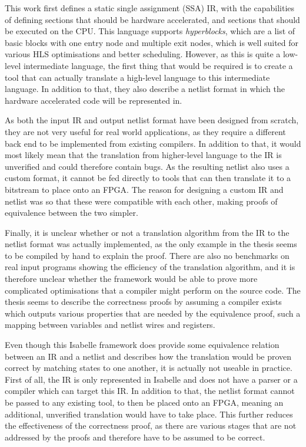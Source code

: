 This work first defines a static single assignment (SSA) IR, with the
capabilities of defining sections that should be hardware accelerated, and
sections that should be executed on the CPU.  This language supports
\emph{hyperblocks}, which are a list of basic blocks with one entry node and
multiple exit nodes, which is well suited for various HLS optimisations and
better scheduling.  However, as this is quite a low-level intermediate language,
the first thing that would be required is to create a tool that can actually
translate a high-level language to this intermediate language.  In addition to
that, they also describe a netlist format in which the hardware accelerated code
will be represented in.

As both the input IR and output netlist format have been designed from scratch,
they are not very useful for real world applications, as they require a
different back end to be implemented from existing compilers.  In addition to
that, it would most likely mean that the translation from higher-level language
to the IR is unverified and could therefore contain bugs.  As the resulting
netlist also uses a custom format, it cannot be fed directly to tools that can
then translate it to a bitstream to place onto an FPGA. The reason for designing
a custom IR and netlist was so that these were compatible with each other,
making proofs of equivalence between the two simpler.

Finally, it is unclear whether or not a translation algorithm from the IR to the
netlist format was actually implemented, as the only example in the thesis seems
to be compiled by hand to explain the proof.  There are also no benchmarks on
real input programs showing the efficiency of the translation algorithm, and it
is therefore unclear whether the framework would be able to prove more
complicated optimisations that a compiler might perform on the source code.  The
thesis seems to describe the correctness proofs by assuming a compiler exists
which outputs various properties that are needed by the equivalence proof, such
a mapping between variables and netlist wires and registers.

Even though this Isabelle framework does provide some equivalence relation
between an IR and a netlist and describes how the translation would be proven
correct by matching states to one another, it is actually not useable in
practice.  First of all, the IR is only represented in Isabelle and does not
have a parser or a compiler which can target this IR.  In addition to that, the
netlist format cannot be passed to any existing tool, to then be placed onto an
FPGA, meaning an additional, unverified translation would have to take place.
This further reduces the effectiveness of the correctness proof, as there are
various stages that are not addressed by the proofs and therefore have to be
assumed to be correct.

